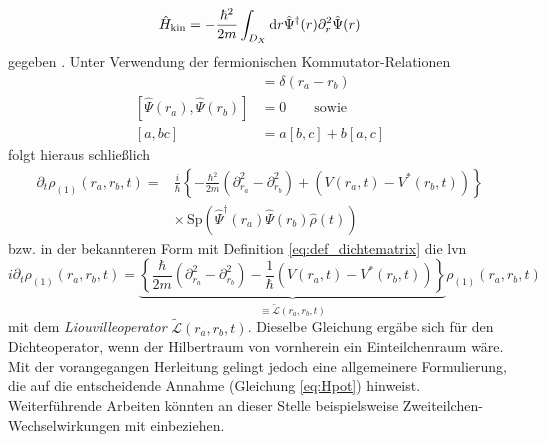 \begin{equation*}
  \hat{H}_{\text{kin}} = -\frac{\hbar^2}{2m}\int_{D_X} \mathop{}\!\mathrm{d} r \hat{\Psi}^{\dagger}(r)\partial_r^2\hat{\Psi}(r)
\end{equation*}
gegeben \cite{modern}. Unter Verwendung der fermionischen Kommutator-Relationen   \cite{modern}
\begin{align*}
  [\hat{\Psi}({r_a}),\hat{\Psi}^{\dagger}({r_b})]&=\delta({r_a}-{r_b}) \\
  [\hat{\Psi}({r_a}),\hat{\Psi}({r_b})]&=0  \qquad \text{sowie}\\
  [a,bc]&=a[b,c]+b[a,c]
\end{align*}
folgt hieraus schließlich
\begin{align*}
  \partial_t \rho_{(1)}({r_a},{r_b},t) = &\frac{i}{\hbar}\left\{-\frac{\hbar^2}{2m}(\partial_{r_a}^2 - \partial_{r_b}^2) + (V({r_a},t) - V^*({r_b},t)) \right\} \\
                          &\times\,\text{Sp}(\hat{\Psi}^{\dagger}({r_a}) \hat{\Psi}({r_b}) \hat{\rho}(t))
\end{align*}
bzw. in der bekannteren Form mit Definition \eqref{eq:def_dichtematrix} die \ac{lvn}
\begin{equation}
  i\partial_t \rho_{(1)}({r_a},{r_b},t) = \underbrace{\left\{\frac{\hbar}{2m}(\partial_{r_a}^2 - \partial_{r_b}^2) - \frac{1}{\hbar}(V({r_a},t) - V^*({r_b},t)) \right\}}_{\equiv{\tilde{\mathcal{L}}({r_a},{r_b},t)}} \rho_{(1)}({r_a},{r_b},t)
  \label{eq:lvn_first}
\end{equation}
mit dem \emph{Liouvilleoperator} $\tilde{\mathcal{L}}({r_a},{r_b},t)$. Dieselbe Gleichung ergäbe sich für den Dichteoperator, wenn der Hilbertraum von vornherein ein Einteilchenraum wäre. Mit der vorangegangen Herleitung gelingt jedoch eine allgemeinere Formulierung, die auf die entscheidende Annahme (Gleichung \eqref{eq:Hpot}) hinweist. Weiterführende Arbeiten könnten an dieser Stelle beispielsweise Zweiteilchen-Wechselwirkungen mit einbeziehen.

